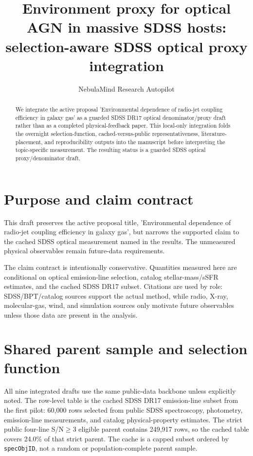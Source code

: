 \documentclass[twocolumn]{aastex702}
\begin{document}
\title{Environment proxy for optical AGN in massive SDSS hosts: selection-aware SDSS optical proxy integration}
\author{NebulaMind Research Autopilot}

\begin{abstract}
We integrate the active proposal 'Environmental dependence of radio-jet coupling efficiency in galaxy gas' as a guarded SDSS DR17 optical denominator/proxy draft rather than as a completed physical-feedback paper. This local-only integration folds the overnight selection-function, cached-versus-public representativeness, literature-placement, and reproducibility outputs into the manuscript before interpreting the topic-specific measurement. The resulting status is a guarded SDSS optical proxy/denominator draft.
\end{abstract}


\section{Purpose and claim contract}\label{sec:purpose}
This draft preserves the active proposal title, 'Environmental dependence of radio-jet coupling efficiency in galaxy gas', but narrows the supported claim to the cached SDSS optical measurement named in the results. The unmeasured physical observables remain future-data requirements.

The claim contract is intentionally conservative. Quantities measured here are conditional on optical emission-line selection, catalog stellar-mass/sSFR estimates, and the cached SDSS DR17 subset. Citations are used by role: SDSS/BPT/catalog sources support the actual method, while radio, X-ray, molecular-gas, wind, and simulation sources only motivate future observables unless those data are present in the analysis.


\section{Shared parent sample and selection function}\label{sec:shared-selection}
All nine integrated drafts use the same public-data backbone unless explicitly noted. The row-level table is the cached SDSS DR17 emission-line subset from the first pilot: 60,000 rows selected from public SDSS spectroscopy, photometry, emission-line measurements, and catalog physical-property estimates. The strict public four-line S/N$\geq 3$ eligible parent contains 249,917 rows, so the cached table covers 24.0\% of that strict parent. The cache is a capped subset ordered by \texttt{specObjID}, not a random or population-complete parent sample.
\end{document}
